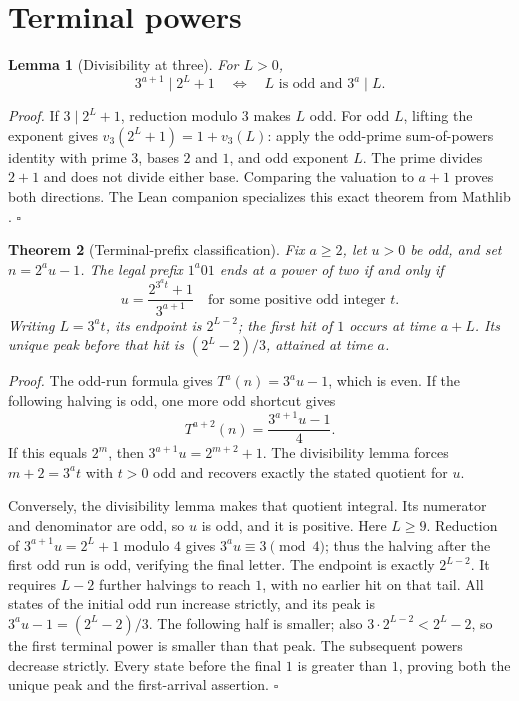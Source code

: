 \documentclass[11pt,letterpaper]{article}
\newtheorem{theorem}{Theorem}
\newtheorem{lemma}[theorem]{Lemma}
\newenvironment{proof}{\noindent\textit{Proof.}}{\hfill\(\square\)}
\begin{document}
\section{Terminal powers}

\begin{lemma}[Divisibility at three]
For \(L>0\),
\[
3^{a+1}\mid2^L+1
\quad\Longleftrightarrow\quad
L\text{ is odd and }3^a\mid L.
\]
\end{lemma}
\begin{proof}
If \(3\mid2^L+1\), reduction modulo \(3\) makes \(L\) odd.
For odd \(L\), lifting the exponent gives
\(v_3(2^L+1)=1+v_3(L)\): apply the odd-prime sum-of-powers identity
with prime \(3\), bases \(2\) and \(1\), and odd exponent \(L\).
The prime divides \(2+1\) and does not divide either base. Comparing
the valuation to \(a+1\) proves both directions. The Lean companion
specializes this exact theorem from Mathlib \cite{Mathlib}.
\end{proof}

\begin{theorem}[Terminal-prefix classification]
Fix \(a\ge2\), let \(u>0\) be odd, and set \(n=2^a u-1\).
The legal prefix \(1^a01\) ends at a power of two if and only if
\[
u=\frac{2^{3^a t}+1}{3^{a+1}}
\quad\text{for some positive odd integer }t.
\]
Writing \(L=3^a t\), its endpoint is \(2^{L-2}\); the first hit of
\(1\) occurs at time \(a+L\). Its unique peak before that hit is
\((2^L-2)/3\), attained at time \(a\).
\end{theorem}
\begin{proof}
The odd-run formula gives \(T^a(n)=3^a u-1\), which is even.
If the following halving is odd, one more odd shortcut gives
\[
T^{a+2}(n)=\frac{3^{a+1}u-1}{4}.
\]
If this equals \(2^m\), then \(3^{a+1}u=2^{m+2}+1\).
The divisibility lemma forces \(m+2=3^a t\) with \(t>0\) odd and
recovers exactly the stated quotient for \(u\).

Conversely, the divisibility lemma makes that quotient integral. Its
numerator and denominator are odd, so \(u\) is odd, and it is positive.
Here \(L\ge9\). Reduction of \(3^{a+1}u=2^L+1\) modulo \(4\) gives
\(3^a u\equiv3\pmod4\); thus the halving after the first odd run is
odd, verifying the final letter. The endpoint is exactly \(2^{L-2}\).
It requires \(L-2\) further halvings to reach \(1\), with no earlier
hit on that tail. All states of the initial odd run increase strictly,
and its peak is \(3^a u-1=(2^L-2)/3\). The following half is smaller;
also \(3\cdot2^{L-2}<2^L-2\), so the first terminal power is smaller
than that peak. The subsequent powers decrease strictly. Every state
before the final \(1\) is greater than \(1\), proving both the unique
peak and the first-arrival assertion.
\end{proof}
\end{document}
